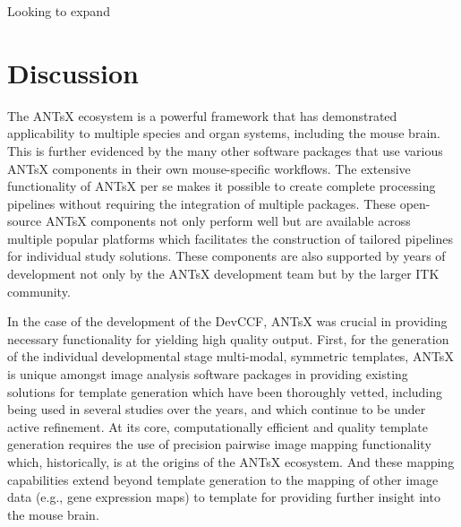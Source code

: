 \documentclass[
  12pt,
]{article}
\begin{document}
Looking to expand \clearpage \newpage

\hypertarget{discussion}{%
\section*{Discussion}\label{discussion}}

The ANTsX ecosystem is a powerful framework that has demonstrated
applicability to multiple species and organ systems, including the mouse
brain. This is further evidenced by the many other software packages
that use various ANTsX components in their own mouse-specific workflows.
The extensive functionality of ANTsX per se makes it possible to create
complete processing pipelines without requiring the integration of
multiple packages. These open-source ANTsX components not only perform
well but are available across multiple popular platforms which
facilitates the construction of tailored pipelines for individual study
solutions. These components are also supported by years of development
not only by the ANTsX development team but by the larger ITK community.

In the case of the development of the DevCCF, ANTsX was crucial in
providing necessary functionality for yielding high quality output.
First, for the generation of the individual developmental stage
multi-modal, symmetric templates, ANTsX is unique amongst image analysis
software packages in providing existing solutions for template
generation which have been thoroughly vetted, including being used in
several studies over the years, and which continue to be under active
refinement. At its core, computationally efficient and quality template
generation requires the use of precision pairwise image mapping
functionality which, historically, is at the origins of the ANTsX
ecosystem. And these mapping capabilities extend beyond template
generation to the mapping of other image data (e.g., gene expression
maps) to template for providing further insight into the mouse brain.
\end{document}
